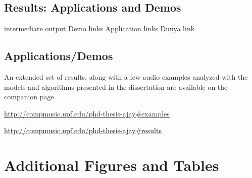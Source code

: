 \section*{Results: Applications and Demos}

intermediate output 
Demo links 
Application links
Dunya link






% 
\section*{Applications/Demos}
An extended set of results, along with a few audio examples analyzed with the models and algorithms presented in the dissertation are available on the companion page.
\begin{description}[style=nextline]
	\item[Audio examples] {\small \url{http://compmusic.upf.edu/phd-thesis-ajay\#examples}}
	\item[Extended results] {\small \url{http://compmusic.upf.edu/phd-thesis-ajay\#results}}
\end{description}







\chapter{Additional Figures and Tables}\label{app:additional_material}

